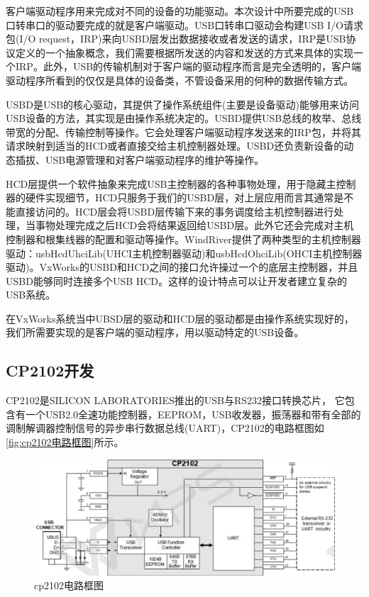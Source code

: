 	客户端驱动程序用来完成对不同的设备的功能驱动。本次设计中所要完成的USB口转串口的驱动要完成的就是客户端驱动。USB口转串口驱动会构建USB I/O请求包(I/O request，IRP)来向USBD层发出数据接收或者发送的请求，IRP是USB协议定义的一个抽象概念，我们需要根据所发送的内容和发送的方式来具体的实现一个IRP。此外，USB的传输机制对于客户端的驱动程序而言是完全透明的，客户端驱动程序所看到的仅仅是具体的设备类，不管设备采用的何种的数据传输方式\cite{李雪红2004USB}。
	
	USBD是USB的核心驱动，其提供了操作系统组件(主要是设备驱动)能够用来访问USB设备的方法，其实现是由操作系统决定的。USBD提供USB总线的枚举、总线带宽的分配、传输控制等操作。它会处理客户端驱动程序发送来的IRP包，并将其请求映射到适当的HCD或者直接交给主机控制器处理。USBD还负责新设备的动态插拔、USB电源管理和对客户端驱动程序的维护等操作。
	
	HCD层提供一个软件抽象来完成USB主控制器的各种事物处理，用于隐藏主控制器的硬件实现细节，HCD只服务于我们的USBD层，对上层应用而言其通常是不能直接访问的。HCD层会将USBD层传输下来的事务调度给主机控制器进行处理，当事物处理完成之后HCD会将结果返回给USBD层。此外它还会完成对主机控制器和根集线器的配置和驱动等操作。WindRiver提供了两种类型的主机控制器驱动：usbHcdUhciLib(UHCI主机控制器驱动)和usbHcdOhciLib(OHCI主机控制器驱动)。VxWorks的USBD和HCD之间的接口允许操过一个的底层主控制器，并且USBD能够同时连接多个USB HCD。这样的设计特点可以让开发者建立复杂的USB系统\cite{李雪红2004USB}。
	
	在VxWorks系统当中UBSD层的驱动和HCD层的驱动都是由操作系统实现好的，我们所需要实现的是客户端的驱动程序，用以驱动特定的USB设备。
	


\subsection{CP2102开发}
	
	CP2102是SILICON LABORATORIES推出的USB与RS232接口转换芯片，
	它包含有一个USB2.0全速功能控制器，EEPROM，USB收发器，振荡器和带有全部的调制解调器控制信号的异步串行数据总线(UART)，CP2102的电路框图如\autoref{fig:cp2102电路框图}所示。

\begin{figure}[!h]
\centering
\includegraphics[width=1.0\textwidth]{./graphics/cp2102-circuit-diagram.pdf}
\caption{cp2102电路框图}\label{fig:cp2102电路框图}
\end{figure}


